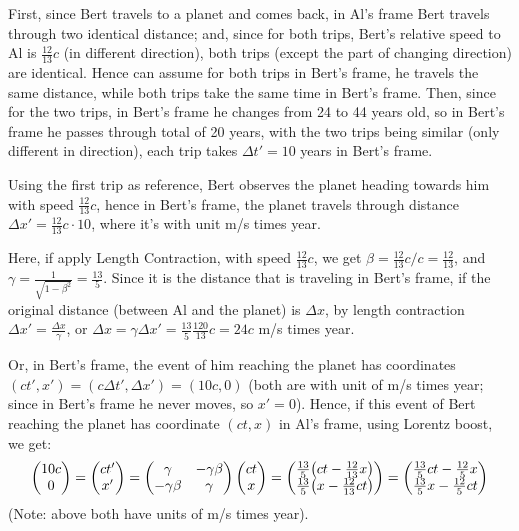\documentclass{article}
\DeclarePairedDelimiter{\paran}{(}{)}%
\begin{document}
First, since Bert travels to a planet and comes back, in Al's frame Bert travels through two identical distance; and, since for both trips, Bert's relative speed to Al is $\frac{12}{13}c$ (in different direction), both trips (except the part of changing direction) are identical. Hence can assume for both trips in Bert's frame, he travels the same distance, while both trips take the same time in Bert's frame. Then, since for the two trips, in Bert's frame he changes from 24 to 44 years old, so in Bert's frame he passes through total of 20 years, with the two trips being similar (only different in direction), each trip takes $\Delta t' = 10$ years in Bert's frame. 

Using the first trip as reference, Bert observes the planet heading towards him with speed $\frac{12}{13}c$, hence in Bert's frame, the planet travels through distance $\Delta x' = \frac{12}{13}c \cdot 10$, where it's with unit m/s times year.

Here, if apply Length Contraction, with speed $\frac{12}{13}c$, we get $\beta = \frac{12}{13}c/c = \frac{12}{13}$, and $\gamma = \frac{1}{\sqrt{1-\beta^2}} = \frac{13}{5}$. Since it is the distance that is traveling in Bert's frame, if the original distance (between Al and the planet) is $\Delta x$, by length contraction $\Delta x' = \frac{\Delta x}{\gamma}$, or $\Delta x=\gamma\Delta x' = \frac{13}{5}\frac{120}{13}c = 24c$ m/s times year.

Or, in Bert's frame, the event of him reaching the planet has coordinates $(ct', x') = (c\Delta t', \Delta x') = (10c, 0)$ (both are with unit of m/s times year; since in Bert's frame he never moves, so $x'=0$). Hence, if this event of Bert reaching the planet has coordinate $(ct, x)$ in Al's frame, using Lorentz boost, we get:
\begin{align}
    \begin{pmatrix}
        10c\\
        0
    \end{pmatrix} = \begin{pmatrix}
        ct'\\x'
    \end{pmatrix} = \begin{pmatrix}
        \gamma & -\gamma\beta\\
        -\gamma\beta & \gamma
    \end{pmatrix}\begin{pmatrix}
        ct\\x
    \end{pmatrix} = \begin{pmatrix}
        \frac{13}{5}\paran*{ct - \frac{12}{13}x}\\
        \frac{13}{5}\paran*{x - \frac{12}{13}ct}
    \end{pmatrix} = \begin{pmatrix}
        \frac{13}{5}ct - \frac{12}{5}x\\
        \frac{13}{5}x - \frac{12}{5}ct
    \end{pmatrix}
\end{align}
(Note: above both have units of m/s times year).
\end{document}

